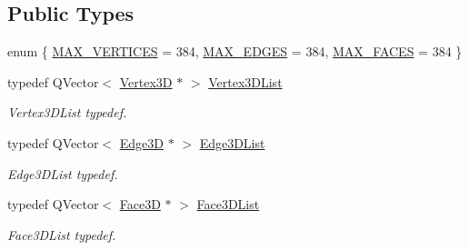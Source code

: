 \subsection*{Public Types}
\begin{DoxyCompactItemize}
\item 
enum \{ \hyperlink{class_solid3_d_a85c6b265036f308d59f14a1945419de3a0bc5c527e2f2681822af8cdbe91f13cb}{M\-A\-X\-\_\-\-V\-E\-R\-T\-I\-C\-E\-S} = 384, 
\hyperlink{class_solid3_d_a85c6b265036f308d59f14a1945419de3adea5e83841760466066bb7ef63f9779f}{M\-A\-X\-\_\-\-E\-D\-G\-E\-S} = 384, 
\hyperlink{class_solid3_d_a85c6b265036f308d59f14a1945419de3a85c95a8842482e9e0db2f3c6ff68f19a}{M\-A\-X\-\_\-\-F\-A\-C\-E\-S} = 384
 \}
\item 
\hypertarget{class_solid3_d_acaa1c40fc6c74ee5c77e64baa3a672b1}{typedef Q\-Vector$<$ \hyperlink{class_vertex3_d}{Vertex3\-D} $\ast$ $>$ \hyperlink{class_solid3_d_acaa1c40fc6c74ee5c77e64baa3a672b1}{Vertex3\-D\-List}}\label{class_solid3_d_acaa1c40fc6c74ee5c77e64baa3a672b1}

\begin{DoxyCompactList}\small\item\em Vertex3\-D\-List typedef. \end{DoxyCompactList}\item 
\hypertarget{class_solid3_d_ac9b57b2279aeedb1dc657ac13271727b}{typedef Q\-Vector$<$ \hyperlink{class_edge3_d}{Edge3\-D} $\ast$ $>$ \hyperlink{class_solid3_d_ac9b57b2279aeedb1dc657ac13271727b}{Edge3\-D\-List}}\label{class_solid3_d_ac9b57b2279aeedb1dc657ac13271727b}

\begin{DoxyCompactList}\small\item\em Edge3\-D\-List typedef. \end{DoxyCompactList}\item 
\hypertarget{class_solid3_d_afd4862e0f4b30967e6f0cb2013ccc084}{typedef Q\-Vector$<$ \hyperlink{class_face3_d}{Face3\-D} $\ast$ $>$ \hyperlink{class_solid3_d_afd4862e0f4b30967e6f0cb2013ccc084}{Face3\-D\-List}}\label{class_solid3_d_afd4862e0f4b30967e6f0cb2013ccc084}

\begin{DoxyCompactList}\small\item\em Face3\-D\-List typedef. \end{DoxyCompactList}\end{DoxyCompactItemize}
